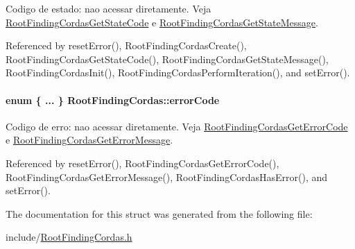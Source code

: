 Codigo de estado: nao acessar diretamente. Veja \hyperlink{group____cordas_g67aaf428f922e7d15a7fbd5a4508ffd7}{RootFindingCordasGetStateCode} e \hyperlink{group____cordas_ga065f13f2ec77b2e949190c1aca9ef9d}{RootFindingCordasGetStateMessage}. 



Referenced by resetError(), RootFindingCordasCreate(), RootFindingCordasGetStateCode(), RootFindingCordasGetStateMessage(), RootFindingCordasInit(), RootFindingCordasPerformIteration(), and setError().\hypertarget{structRootFindingCordas_237764d1db5221c0fb51189ae84b626a}{
\paragraph[errorCode]{\setlength{\rightskip}{0pt plus 5cm}enum \{ ... \}   {\bf RootFindingCordas::errorCode}}\hfill}
\label{structRootFindingCordas_237764d1db5221c0fb51189ae84b626a}


Codigo de erro: nao acessar diretamente. Veja \hyperlink{group____cordas_gcc4b8454f6664e389c484498f42c17d8}{RootFindingCordasGetErrorCode} e \hyperlink{group____cordas_g5a6750a998093e1701c8a01ae24e9cc2}{RootFindingCordasGetErrorMessage}. 



Referenced by resetError(), RootFindingCordasGetErrorCode(), RootFindingCordasGetErrorMessage(), RootFindingCordasHasError(), and setError().

The documentation for this struct was generated from the following file:\begin{CompactItemize}
\item 
include/\hyperlink{RootFindingCordas_8h}{RootFindingCordas.h}\end{CompactItemize}
